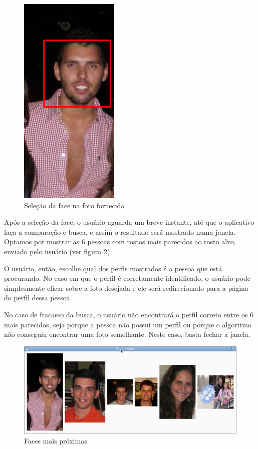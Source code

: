 \documentclass[10pt,a4paper]{article}
\begin{document}
\begin{figure}[h!]
  \begin{center}
    \includegraphics[scale=0.4]{samephoto}
    \caption{ Seleção da face na foto fornecida}
  \end{center}
\end{figure}

Após a seleção da face, o usuário aguarda um breve instante, até que o aplicativo faça a comparação e busca, e assim o resultado será mostrado numa janela. Optamos por mostrar as 6 pessoas com rostos mais parecidos ao rosto alvo, enviado pelo usuário (ver figura 2).

O usuário, então,  escolhe qual dos perfis mostrados é a pessoa que está procurando. No caso em que o perfil é corretamente identificado, o usuário pode simplesmente clicar sobre a foto desejada e ele será redirecionado para a página do perfil dessa pessoa.

No caso de fracasso da busca, o usuário não encontrará o perfil correto entre os 6 mais parecidos, seja porque a pessoa não possui um perfil ou porque o algoritmo não conseguiu encontrar uma foto semelhante. Neste caso, basta fechar a janela.

\begin{center}
  \begin{figure}[h!]
    \includegraphics[scale=0.5]{6maisproximos}
    \caption{Faces mais próximas}
  \end{figure}
\end{center}
\end{document}
